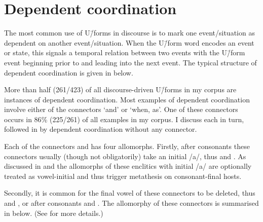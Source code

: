\section{Dependent coordination}\label{sec:DepCoo}
The most common use of U\=/forms in discourse is to mark one event/situation
as dependent on another event/situation.
When the U\=/form word encodes an event or state,
this signals a temporal relation between two events
with the U\=/form event beginning prior to and leading into the next event.
The typical structure of dependent coordination is given in  below.

\begin{exe}
	\label{ex:ChrCoo}
\end{exe}

More than half (261/423) of all discourse-driven U\=/forms in my corpus
are instances of dependent coordination.
Most examples of dependent coordination involve either of
the connectors  `and' or   `when, as'.
One of these connectors occurs in 86{\%} (225/261) of all examples in my corpus.
I discuss each in turn, followed in 
by dependent coordination without any connector.

Each of the connectors  and  has four allomorphs.
Firstly, after consonants these connectors usually
(though not obligatorily) take an initial /a/, thus  and .
As discussed in  and 
the allomorphs of these enclitics with initial /a/ are optionally
treated as vowel-initial and thus trigger metathesis on consonant-final hosts.

Secondly, it is common for the final vowel of these connectors
to be deleted, thus  and , or after consonants  and .
The allomorphy of these connectors is summarised in  below.
(See  for more details.)

\begin{exe}\let\eachwordone=\textnormal
	\label{ex:ConAll}
\end{exe}

